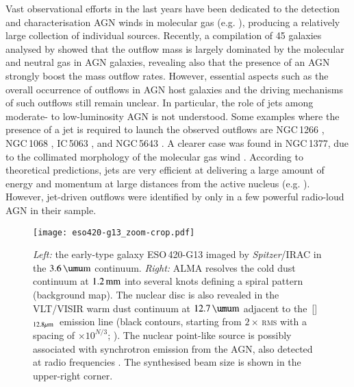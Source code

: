 \documentclass[longauth]{aa}
\newcommand{\neii}{\,\hbox{[\ion{Ne}{ii}]$_{\rm 12.8 \mu m}$}}
\def\micron{\hbox{$\umu$m}}
\begin{document}
Vast observational efforts in the last years have been dedicated to the detection and characterisation AGN winds in molecular gas (e.g. ), producing a relatively large collection of individual sources. Recently, a compilation of 45 galaxies analysed by  showed that the outflow mass is largely dominated by the molecular and neutral gas in AGN galaxies, revealing also that the presence of an AGN strongly boost the mass outflow rates. However, essential aspects such as the overall occurrence of outflows in AGN host galaxies and the driving mechanisms of such outflows still remain unclear. In particular, the role of jets among moderate- to low-luminosity AGN is not understood. Some examples where the presence of a jet is required to launch the observed outflows are NGC\,1266 , NGC\,1068 , IC\,5063 , and NGC\,5643 . A clearer case was found in NGC\,1377, due to the collimated morphology of the molecular gas wind . According to theoretical predictions, jets are very efficient at delivering a large amount of energy and momentum at large distances from the active nucleus (e.g. ). However, jet-driven outflows were identified by  only in a few powerful radio-loud AGN in their sample.
\begin{figure*}
\centering
\texttt{[image: eso420-g13\_zoom-crop.pdf]}
\caption{\textit{Left:} the early-type galaxy ESO\,420-G13 imaged by \textit{Spitzer}/IRAC in the $3.6\, \rm{\micron}$ continuum. \textit{Right:} ALMA resolves the cold dust continuum at $1.2\, \rm{mm}$ into several knots defining a spiral pattern (background map). The nuclear disc is also revealed in the VLT/VISIR warm dust continuum at $12.7\, \rm{\micron}$ adjacent to the \neii \ emission line (black contours, starting from $2 \times$\,\textsc{rms} with a spacing of $\times 10^{N/3}$; ). The nuclear point-like source is possibly associated with synchrotron emission from the AGN, also detected at radio frequencies . The synthesised beam size is shown in the upper-right corner.}\label{fig_zoom}
\end{figure*}
\end{document}
